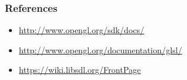 \begin{frame}
  \frametitle{References}
  \begin{itemize}
    \item \url{http://www.opengl.org/sdk/docs/}
    \item \url{http://www.opengl.org/documentation/glsl/}
    \item \url{https://wiki.libsdl.org/FrontPage}
  \end{itemize}
\end{frame}

